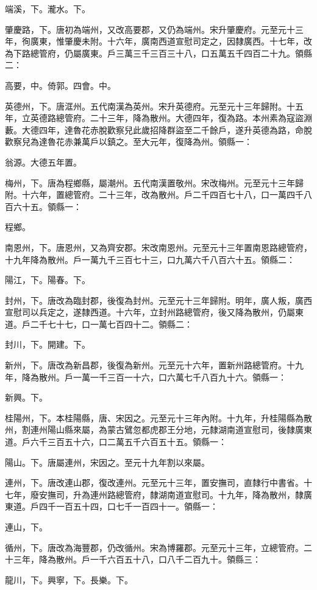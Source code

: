 \begin{pinyinscope}
 端溪，下。瀧水。下。



 肇慶路，下。唐初為端州，又改高要郡，又仍為端州。宋升肇慶府。元至元十三年，徇廣東，惟肇慶未附。十六年，廣南西道宣慰司定之，因隸廣西。十七年，改為下路總管府，仍屬廣東。戶三萬三千三百三十八，口五萬五千四百二十九。領縣二：



 高要，中。倚郭。四會。中。



 英德州，下。唐洭州。五代南漢為英州。宋升英德府。元至元十三年歸附。十五年，立英德路總管府。二十三年，降為散州。大德四年，復為路。本州素為寇盜淵藪。大德四年，達魯花赤脫歡察兒此歲招降群盜至二千餘戶，遂升英德為路，命脫歡察兒為達魯花赤兼萬戶以鎮之。至大元年，復降為州。領縣一：



 翁源。大德五年置。



 梅州，下。唐為程鄉縣，屬潮州。五代南漢置敬州。宋改梅州。元至元十三年歸附。十六年，置總管府。二十三年，改為散州。戶二千四百七十八，口一萬四千八百六十五。領縣一：



 程鄉。



 南恩州，下。唐恩州，又為齊安郡。宋改南恩州。元至元十三年置南恩路總管府，十九年降為散州。戶一萬九千三百七十三，口九萬六千八百六十五。領縣二：



 陽江，下。陽春。下。



 封州，下。唐改為臨封郡，後復為封州。元至元十三年歸附。明年，廣人叛，廣西宣慰司以兵定之，遂隸西道。十六年，立封州路總管府，後又降為散州，仍屬東道。戶二千七十七，口一萬七百四十二。領縣二：



 封川，下。開建。下。



 新州，下。唐改為新昌郡，後復為新州。元至元十六年，置新州路總管府。十九年，降為散州。戶一萬一千三百一十六，口六萬七千八百九十六。領縣一：



 新興。下。



 桂陽州，下。本桂陽縣，唐、宋因之。元至元十三年內附。十九年，升桂陽縣為散州，割連州陽山縣來屬，為蒙古鷿忽都虎郡王分地，元隸湖南道宣慰司，後隸廣東道。戶六千三百五十六，口二萬五千六百五十五。領縣一：



 陽山。下。唐屬連州，宋因之。至元十九年割以來屬。



 連州，下。唐改連山郡，復改連州。元至元十三年，置安撫司，直隸行中書省。十七年，廢安撫司，升為連州路總管府，隸湖南道宣慰司。十九年，降為散州，隸廣東道。戶四千一百五十四，口七千一百四十一。領縣一：



 連山，下。



 循州，下。唐改為海豐郡，仍改循州。宋為博羅郡。元至元十三年，立總管府。二十三年，降為散州。戶一千六百五十八，口八千二百九十。領縣三：



 龍川，下。興寧，下。長樂。下。



\end{pinyinscope}